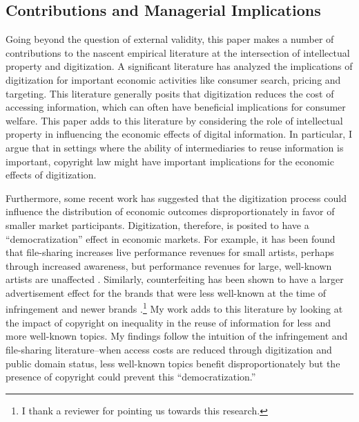 \documentclass[11pt]{article}
\begin{document}
\subsection{Contributions and Managerial Implications}


Going beyond the question of external validity, this paper makes a number of contributions to the nascent empirical literature at the intersection of intellectual property and digitization. A significant literature has analyzed the implications of digitization for important economic activities like consumer search, pricing and targeting. This literature generally posits that digitization reduces the cost of accessing information, which can often have beneficial implications for consumer welfare. This paper adds to this literature by considering the role of intellectual property in influencing the economic effects of digital information. In particular, I argue that in settings where the ability of intermediaries to reuse information is important, copyright law might have important implications for the economic effects of digitization. 

Furthermore, some recent work has suggested that the digitization process could influence the distribution of economic outcomes disproportionately in favor of smaller market participants. Digitization, therefore, is posited to have a ``democratization'' effect in economic markets. For example, it has been found that file-sharing increases live performance revenues for small artists, perhaps through increased awareness, but performance revenues for large, well-known artists are unaffected \citep{mortimer_supply_2012}. Similarly, counterfeiting has been shown to have a larger advertisement effect for the brands that were less well-known at the time of infringement and newer brands \citep{qian_counterfeiters:_2014}.\footnote{I thank a reviewer for pointing us towards this research.} My work adds to this literature by looking at the impact of copyright on inequality in the reuse of information for less and more well-known topics. My findings follow the intuition of the infringement and file-sharing literature--when access costs are reduced through digitization and public domain status, less well-known topics benefit disproportionately but the presence of copyright could prevent this ``democratization.''
\end{document}
